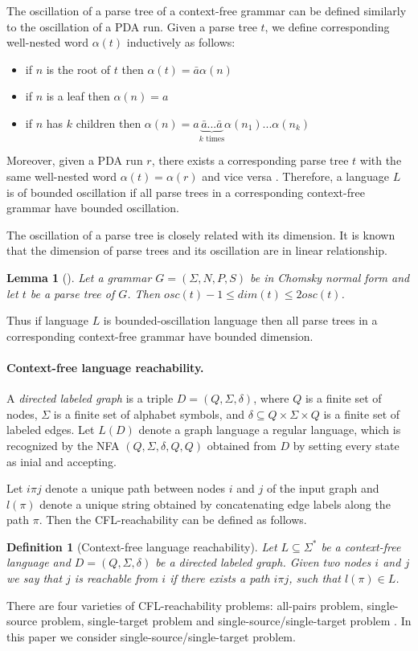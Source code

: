\documentclass[11pt,a4paper]{article} %
\newtheorem{lemma}{Lemma}
\newtheorem{definition}{Definition}
\begin{document}
The oscillation of a parse tree of a context-free grammar can be defined similarly to the oscillation of a PDA run. Given a parse tree $t$, we define corresponding well-nested word $\alpha(t)$ inductively as follows:
\begin{itemize}
\item if $n$ is the root of $t$ then $\alpha(t) = \bar{a}\alpha(n)$
\item if $n$ is a leaf then $\alpha(n)=a$
\item if $n$ has $k$ children then $\alpha(n) = a\underbrace{\bar{a}...\bar{a}}_\text{$k$ times}\alpha(n_1)...\alpha(n_k)$
\end{itemize}


Moreover, given a PDA run $r$, there exists a corresponding parse tree $t$ with the same well-nested word $\alpha(t)=\alpha(r)$ and vice versa \cite{BoundOsc}. Therefore, a language $L$ is of bounded oscillation if all parse trees in a corresponding context-free grammar have bounded oscillation.


The oscillation of a parse tree is closely related with its dimension. 
It is known that the dimension of parse trees and its oscillation are in linear relationship.

\begin{lemma}[\cite{BoundOsc}]
\label{boscdim}
Let a grammar $G = (\Sigma, N, P, S)$ be in Chomsky normal form and let $t$ be a parse tree of $G$. Then $osc(t) - 1 \le dim(t) \le 2osc(t)$.
\end{lemma}
Thus if language $L$ is bounded-oscillation language then all parse trees in a corresponding context-free grammar have bounded dimension.
\paragraph{Context-free language reachability.} 
A \textit{directed labeled graph} is a triple $D = (Q, \Sigma, \delta)$, where $Q$ is a finite set of nodes, $\Sigma$ is a finite set of alphabet symbols,
and $\delta \subseteq Q \times \Sigma \times Q$ is a finite set of labeled edges. Let $L(D)$ denote a graph language a regular language, which is recognized by the NFA $(Q,\Sigma ,\delta ,Q, Q)$ obtained from $D$ by setting every state as inial and accepting.


Let $i\pi j$ denote a unique path between nodes $i$ and $j$ of the input graph and $l(\pi)$ denote a unique string obtained by concatenating edge labels along the path $\pi$. Then the CFL-reachability can be defined as follows.
\begin{definition}[Context-free language reachability]
Let $L \subseteq \Sigma^*$ be a context-free language and $D = (Q, \Sigma, \delta)$ be a directed labeled graph. Given two nodes $i$ and $j$ we say that $j$ is \textit{reachable} from $i$ if there exists a path $i \pi j$, such that $l(\pi) \in L$. 
\end{definition}
There are four varieties of CFL-reachability problems: all-pairs problem, single-source problem, single-target problem and single-source/single-target problem \cite{RepsBasic}. In this paper we consider single-source/single-target problem. 
\end{document}
